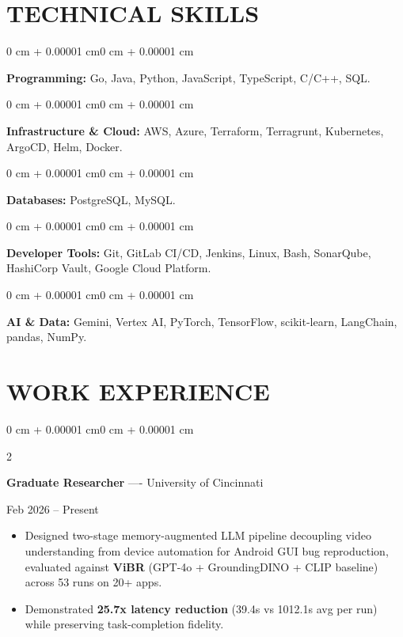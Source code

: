 \documentclass[10pt, letterpaper]{article}
\newenvironment{highlights}{
    \begin{itemize}[
        topsep=0.10 cm,
        parsep=0.06 cm,
        partopsep=0pt,
        itemsep=0.06 cm,
        leftmargin=12pt
    ]
}{
    \end{itemize}
}
\newenvironment{onecolentry}{
    \begin{adjustwidth}{0 cm + 0.00001 cm}{0 cm + 0.00001 cm}
}{
    \end{adjustwidth}
}
\newenvironment{twocolentry}[2][]{
    \onecolentry
    \def\secondColumn{#2}
    \setcolumnwidth{\fill, 4.5 cm}
    \begin{paracol}{2}
}{
    \switchcolumn \raggedleft \secondColumn
    \end{paracol}
    \endonecolentry
}
\begin{document}
\section{TECHNICAL SKILLS}
\begin{onecolentry}
\textbf{Programming:} Go, Java, Python, JavaScript, TypeScript, C/C++, SQL.
\end{onecolentry}
\vspace{0.06 cm}
\begin{onecolentry}
\textbf{Infrastructure \& Cloud:} AWS, Azure, Terraform, Terragrunt, Kubernetes, ArgoCD, Helm, Docker.
\end{onecolentry}
\vspace{0.06 cm}
\begin{onecolentry}
\textbf{Databases:} PostgreSQL, MySQL.
\end{onecolentry}
\vspace{0.06 cm}
\begin{onecolentry}
\textbf{Developer Tools:} Git, GitLab CI/CD, Jenkins, Linux, Bash, SonarQube, HashiCorp Vault, Google Cloud Platform.
\end{onecolentry}
\vspace{0.06 cm}
\begin{onecolentry}
\textbf{AI \& Data:} Gemini, Vertex AI, PyTorch, TensorFlow, scikit-learn, LangChain, pandas, NumPy.
\end{onecolentry}

\section{WORK EXPERIENCE}
\begin{twocolentry}{Feb 2026 -- Present}
\textbf{Graduate Researcher} ---- University of Cincinnati
\end{twocolentry}
\begin{highlights}
  \item Designed two-stage memory-augmented LLM pipeline decoupling video understanding from device automation for Android GUI bug reproduction, evaluated against \textbf{ViBR} (GPT-4o + GroundingDINO + CLIP baseline) across 53 runs on 20+ apps.
  \item Demonstrated \textbf{25.7x latency reduction} (39.4s vs 1012.1s avg per run) while preserving task-completion fidelity.
\end{highlights}
\end{document}
